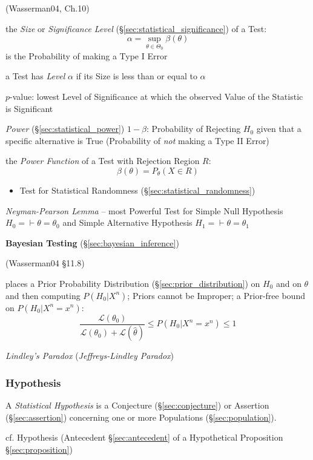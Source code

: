 (Wasserman04, Ch.10)

the \emph{Size} or \emph{Significance Level}
(\S\ref{sec:statistical_significance}) of a Test:
\[
  \alpha = \sup_{\theta \in \Theta_0} \beta(\theta)
\]
is the Probability of making a Type I Error

a Test has \emph{Level} $\alpha$ if its Size is less than or equal to $\alpha$

$p$-value: lowest Level of Significance at which the observed Value of
the Statistic is Significant

\emph{Power} (\S\ref{sec:statistical_power}) $1 - \beta$: Probability of
Rejecting $H_0$ given that a specific alternative is True (Probability of
\emph{not} making a Type II Error)

the \emph{Power Function} of a Test with Rejection Region $R$:
\[
  \beta(\theta) = P_\theta(X \in R)
\]

\begin{itemize}
  \item Test for Statistical Randomness (\S\ref{sec:statistical_randomness})
\end{itemize}

\emph{Neyman-Pearson Lemma} -- most Powerful Test for Simple Null Hypothesis
$H_0 = \vdash \theta = \theta_0$ and Simple Alternative Hypothesis
$H_1 = \vdash \theta = \theta_1$

\asterism

\textbf{Bayesian Testing} (\S\ref{sec:bayesian_inference})

(Wasserman04 \S11.8)

places a Prior Probability Distribution (\S\ref{sec:prior_distribution}) on
$H_0$ and on $\theta$ and then computing $P(H_0 | X^n)$; Priors cannot be
Improper; a Prior-free bound on $P(H_0|X^n = x^n)$:
\[
  \frac{\mathcal{L}(\theta_0)}{\mathcal{L}(\theta_0) + \mathcal{L}(\hat\theta)}
    \leq P(H_0|X^n = x^n) \leq 1
\]

\emph{Lindley's Paradox} (\emph{Jeffreys-Lindley Paradox})



\subsubsection{Hypothesis}\label{sec:hypothesis}

A \emph{Statistical Hypothesis} is a Conjecture (\S\ref{sec:conjecture}) or
Assertion (\S\ref{sec:assertion}) concerning one or more Populations
(\S\ref{sec:population}).

cf. Hypothesis (Antecedent \S\ref{sec:antecedent} of a Hypothetical Proposition
\S\ref{sec:proposition})



